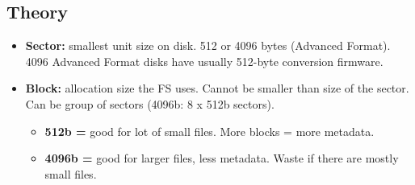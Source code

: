 \documentclass[10pt, a4paper, onecolumn, oneside, titlepage, openany]{book}
\begin{document}
\subsection{Theory}
\begin{itemize}
    \item \textbf{Sector:} smallest unit size on disk. 512 or 4096 bytes (Advanced Format). 4096 Advanced Format disks have usually 512-byte conversion firmware.
    \item \textbf{Block:} allocation size the FS uses. Cannot be smaller than size of the sector. Can be group of sectors (4096b: 8 x 512b sectors).
    \begin{itemize}
        \item \textbf{512b =} good for lot of small files. More blocks = more metadata.
        \item \textbf{4096b =}  good for larger files, less metadata. Waste if there are mostly small files.
    \end{itemize}
\end{itemize}
\end{document}
